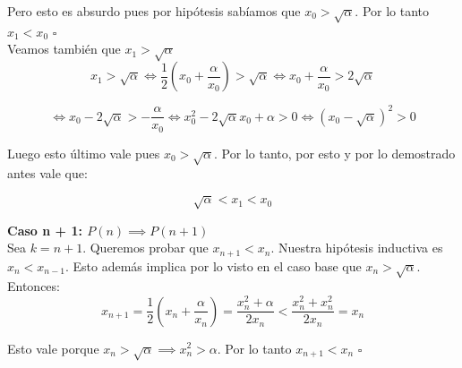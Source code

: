 Pero esto es absurdo pues por hipótesis sabíamos que $x_0 > \sqrt{\alpha}$. Por lo tanto $x_1 < x_0$ $\square$\\

Veamos también que $x_1 > \sqrt{\alpha}$\\

\begin{displaymath}
    x_1 > \sqrt{\alpha} \iff \frac{1}{2}(x_0 + \frac{\alpha}{x_0}) > \sqrt{\alpha} \iff x_0 + \frac{\alpha}{x_0} > 2\sqrt{\alpha}
\end{displaymath}

\begin{displaymath}
    \iff x_0 - 2\sqrt{\alpha} > -\frac{\alpha}{x_0} \iff x_0^2 - 2\sqrt{\alpha}x_0 + \alpha > 0 \iff (x_0 - \sqrt{\alpha})^2 > 0
\end{displaymath}

Luego esto último vale pues $x_0 > \sqrt{\alpha}$. Por lo tanto, por esto y por lo demostrado antes vale que:

\begin{displaymath}
    \sqrt{\alpha} < x_1 < x_0
\end{displaymath}

{\bf Caso n + 1: $P(n) \implies P(n + 1)$}\\
Sea $k = n + 1$. Queremos probar que $x_{n + 1} < x_n$. Nuestra hipótesis inductiva es $x_n < x_{n - 1}$. Esto además implica por lo visto en el caso base que $x_n > \sqrt{\alpha}$.\\

Entonces:
\begin{displaymath}
    x_{n + 1} = \frac{1}{2}(x_n + \frac{\alpha}{x_n}) = \frac{x_n^2 + \alpha}{2x_n} < \frac{x_n^2 + x_n^2}{2x_n} = x_n
\end{displaymath}

Esto vale porque $x_n > \sqrt{\alpha} \implies x_n^2 > \alpha$. Por lo tanto $x_{n + 1} < x_n$ $\square$


